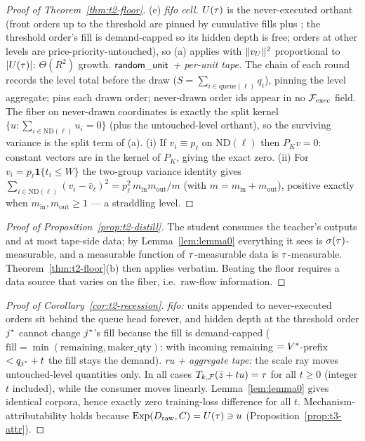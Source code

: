 \begin{proof}[Proof of Theorem~\ref{thm:t2-floor}]
(e) \emph{fifo cell.} $U(\tau)$ is the never-executed orthant (front orders up
to the threshold are pinned by cumulative fills plus
; the threshold order's fill is demand-capped so its
hidden depth is free; orders at other levels are price-priority-untouched),
so (a) applies with $\|v_{U}\|^2$ proportional to $|U(\tau)|$: $\Theta(R^2)$
growth. \emph{$\mathsf{random\_unit}$ + per-unit tape.} The  chain of
each round records the level total before the draw
($S = \sum_{i \in \mathrm{queue}(\ell)} q_i$), pinning the level aggregate;
 pins each drawn order; never-drawn order ids appear
in no $\mathcal{F}_{\mathrm{exec}}$ field. The fiber on never-drawn coordinates is exactly the
split kernel $\{u : \sum_{i \in \mathrm{ND}(\ell)} u_i = 0\}$ (plus the
untouched-level orthant), so the surviving variance is the split term of
(a). (i) If $v_i \equiv p_\ell$ on $\mathrm{ND}(\ell)$ then $P_Kv = 0$:
constant vectors are in the kernel of $P_K$, giving the exact zero.
(ii) For $v_i = p_\ell\mathbf{1}\{t_i \le W\}$ the two-group variance
identity gives
$\sum_{i \in \mathrm{ND}(\ell)}(v_i - \bar{v}_\ell)^2 = p_\ell^2\,
m_{\mathrm{in}}m_{\mathrm{out}}/m$
(with $m = m_{\mathrm{in}} + m_{\mathrm{out}}$), positive exactly when
$m_{\mathrm{in}}, m_{\mathrm{out}} \ge 1$ --- a straddling level.
\end{proof}

\begin{proof}[Proof of Proposition~\ref{prop:t2-distill}]
The student consumes the teacher's outputs and at most tape-side data; by
Lemma~\ref{lem:lemma0} everything it sees is $\sigma(\tau)$-measurable,
and a measurable function of $\tau$-measurable data is $\tau$-measurable.
Theorem~\ref{thm:t2-floor}(b) then applies verbatim. Beating the floor
requires a data source that varies on the fiber, i.e.\ raw-flow information.
\end{proof}

\begin{proof}[Proof of Corollary~\ref{cor:t2-recession}]
\emph{fifo:} units appended to never-executed orders sit behind the queue
head forever, and hidden depth at the threshold order $j^{*}$ cannot change
$j^{*}$'s fill because the fill is demand-capped
($\mathrm{fill} = \min(\mathrm{remaining}, \mathrm{maker\_qty})$: with
incoming remaining $= V^{*}$-prefix $< q_{j^{*}} + t$ the fill stays the
demand). \emph{ru + aggregate tape:} the scale ray moves untouched-level
quantities only. In all cases $T_{k,\mathcal{F}}(\bar{z} + tu) = \tau$
for all $t \ge 0$ (integer $t$ included), while the consumer moves linearly.
Lemma~\ref{lem:lemma0} gives identical corpora, hence exactly zero
training-loss difference for all $t$. Mechanism-attributability holds
because $\operatorname{Exp}(D_{\mathrm{raw}}, C) = U(\tau) \ni u$
(Proposition~\ref{prop:t3-attr}).
\end{proof}

